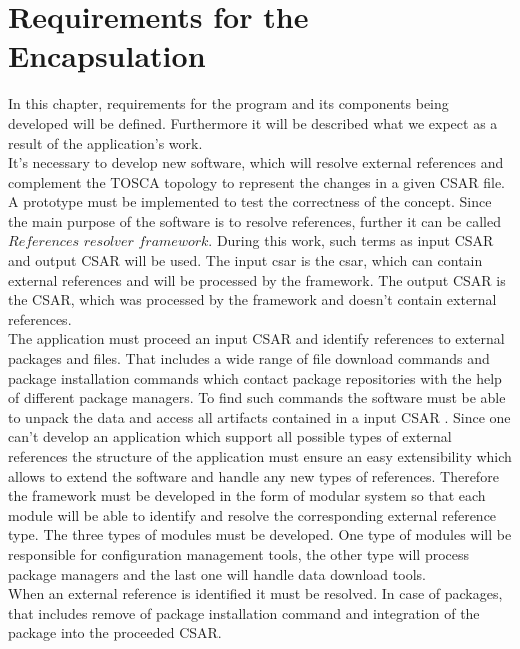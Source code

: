 
\chapter{Requirements for the Encapsulation}\label{chap:req}
In this chapter, requirements for the program and its components being developed will be defined.
Furthermore it will be described what we expect as a result of the application's work.\\
It's necessary to develop new software, which will resolve external references and complement the TOSCA topology to represent the changes in a given CSAR file.
A prototype must be implemented to test the correctness of the concept.
Since the main purpose of the software is to resolve references, further it can be called $References$ $resolver$ $framework$.  
During this work, such terms as input CSAR and output CSAR will be used.
The input \gls{csar} is the \gls{csar}, which can contain external references and will be processed by the framework. %
The output CSAR is the CSAR, which was processed by the framework and doesn't contain external references. \\%
The application must proceed an input CSAR and identify references to external packages and files.
That includes a wide range of file download commands and package installation commands which contact package repositories with the help of different package managers.
To find such commands the software must be able to unpack the data and access all artifacts contained in a input CSAR .
Since one can't develop an application which support all possible types of external references the structure of the application must ensure an easy extensibility which allows to extend the software and handle any new types of references.
Therefore the framework must be developed in the form of modular system so that each module will be able to identify and resolve the corresponding external reference type.
The three types of modules must be developed.
One type of modules will be responsible for configuration management tools, the other type will process package managers and the last one will handle data download tools.\\
When an external reference is identified it must be resolved. 
In case of packages, that includes remove of package installation command and integration of the package into the proceeded CSAR.
